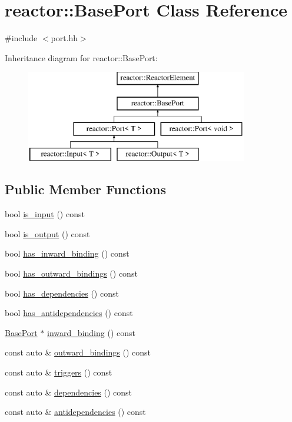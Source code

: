 \hypertarget{classreactor_1_1BasePort}{}\section{reactor\+:\+:Base\+Port Class Reference}
\label{classreactor_1_1BasePort}


{\ttfamily \#include $<$port.\+hh$>$}

Inheritance diagram for reactor\+:\+:Base\+Port\+:\begin{figure}[H]
\begin{center}
\leavevmode
\includegraphics[height=4.000000cm]{classreactor_1_1BasePort}
\end{center}
\end{figure}
\subsection*{Public Member Functions}
\begin{DoxyCompactItemize}
\item 
bool \hyperlink{classreactor_1_1BasePort_ad488760a5ed50b9bbf137d4e52c053f7}{is\+\_\+input} () const
\item 
bool \hyperlink{classreactor_1_1BasePort_ad5ebded21426bfcf02359b1ab3fdf7d8}{is\+\_\+output} () const
\item 
bool \hyperlink{classreactor_1_1BasePort_a8d8a93a2d15683d29ec7a4ec483db01a}{has\+\_\+inward\+\_\+binding} () const
\item 
bool \hyperlink{classreactor_1_1BasePort_a397f8bbc24835a01bfad591abb85bcb4}{has\+\_\+outward\+\_\+bindings} () const
\item 
bool \hyperlink{classreactor_1_1BasePort_a687c0460c4823d90d150c6a363e256a9}{has\+\_\+dependencies} () const
\item 
bool \hyperlink{classreactor_1_1BasePort_a0c046ef79ccf68f8a68f788df774aed3}{has\+\_\+antidependencies} () const
\item 
\hyperlink{classreactor_1_1BasePort}{Base\+Port} $\ast$ \hyperlink{classreactor_1_1BasePort_af4a42f14f878509c00bb16d0c5b2c201}{inward\+\_\+binding} () const
\item 
const auto \& \hyperlink{classreactor_1_1BasePort_aaf404379c3908577b7fc7e394d5c972c}{outward\+\_\+bindings} () const
\item 
const auto \& \hyperlink{classreactor_1_1BasePort_a71208c7024e39242b1012091daf7b7ed}{triggers} () const
\item 
const auto \& \hyperlink{classreactor_1_1BasePort_aab124dee21981b289b55c2e2c8e3922d}{dependencies} () const
\item 
const auto \& \hyperlink{classreactor_1_1BasePort_a9158ab37ab600ea2b8a39749ca9404c4}{antidependencies} () const
\end{DoxyCompactItemize}

